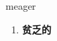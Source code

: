 
\begin{frame}
{\huge meager}
\begin{center}
\begin{enumerate}\Large
  \item \textbf{贫乏的}
\end{enumerate}
\end{center}
\end{frame}
